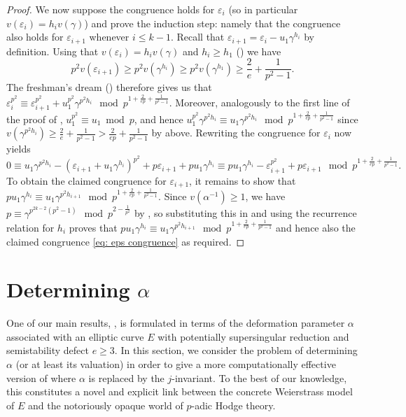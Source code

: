 \documentclass{amsart}
\theoremstyle{definition}
\numberwithin{theorem}{section}
\numberwithin{equation}{section}
\begin{document}
\begin{proof}
    We now suppose the congruence holds for $\varepsilon_i$ (so in particular $v(\varepsilon_i)=h_iv(\gamma)$) and prove the induction step: namely that the congruence also holds for $\varepsilon_{i+1}$ whenever $i \leq k-1$. 
    Recall that $\varepsilon_{i+1}=\varepsilon_{i}-u_1\gamma^{h_i}$ by definition. Using that $v(\varepsilon_{i})=h_iv(\gamma)$ and $h_i \geq h_1$ () we have
    \[
    p^2v(\varepsilon_{i+1}) \geq p^2v(\gamma^{h_i}) \geq p^2v(\gamma^{h_1}) \geq \frac{2}{e}+\frac{1}{p^2-1}.
    \]
    The freshman's dream () therefore gives us that $\varepsilon_{i}^{p^2} \equiv \varepsilon_{i+1}^{p^2} + u_1^{p^2}\gamma^{p^2h_i} \mod p^{1+\frac{2}{ep}+\frac{1}{p^2-1}}$. Moreover, analogously to the first line of the proof of , $u_1^{p^2}\equiv u_1 \bmod p$, and hence $u_1^{p^2} \gamma^{p^2 h_i} \equiv u_1 \gamma^{p^2h_i} \mod p^{1+\frac{2}{ep}+\frac{1}{p^2-1}}$ since $v(\gamma^{p^2h_i}) \ge\frac{2}{e}+\frac{1}{p^2-1} > \frac{2}{ep} + \frac{1}{p^2-1}$ by above.
    Rewriting the congruence for $\varepsilon_i$ now yields
    \begin{equation*}
        0 \equiv u_1\gamma^{p^2h_i} - (\varepsilon_{i+1} + u_1\gamma^{h_i})^{p^2} + p\varepsilon_{i+1} + pu_1\gamma^{h_i} \equiv p u_1 \gamma^{h_i} - \varepsilon_{i+1}^{p^2} + p\varepsilon_{i+1} \mod p^{1+\frac{2}{ep}+\frac{1}{p^2-1}}.
    \end{equation*}
    To obtain the claimed congruence for $\varepsilon_{i+1}$, it remains to show that $pu_1 \gamma^{h_i} \equiv u_1\gamma^{p^2h_{i+1}} \mod p^{1+\frac{2}{ep}+\frac{1}{p^2-1}}.$ Since $v(\alpha^{-1}) \geq 1$, we have $p \equiv \gamma^{p^{2k-2}(p^2-1)} \mod p^{2 - \frac{1}{p^2}}$ by , so substituting this in and using the recurrence relation for $h_i$ proves that $pu_1 \gamma^{h_i} \equiv u_1\gamma^{p^2h_{i+1}} \mod p^{1+\frac{2}{ep}+\frac{1}{p^2-1}}$ and hence also the claimed congruence \eqref{eq: eps congruence} as required.
\end{proof}


\section{Determining $\alpha$}\label{sect: parameter alpha}

One of our main results, , is formulated in terms of the deformation parameter $\alpha$ associated with an elliptic curve $E$ with potentially supersingular reduction and semistability defect $e \geq 3$. 
In this section, we consider the problem of determining $\alpha$ (or at least its valuation) in order to give a more computationally effective version of  where $\alpha$ is replaced by the $j$-invariant. To the best of our knowledge, this constitutes a novel and explicit link between the concrete Weierstrass model of $E$ and the notoriously opaque world of $p$-adic Hodge theory.
\end{document}

